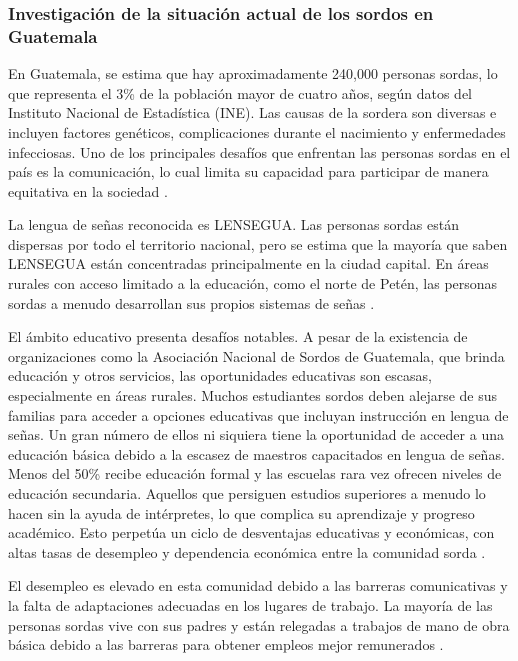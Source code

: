 
\subsubsection{Investigación de la situación actual de los sordos en Guatemala}

En Guatemala, se estima que hay aproximadamente 240,000 personas sordas, lo que representa el 3\% de la población mayor de cuatro años, según datos del Instituto Nacional de Estadística (INE). Las causas de la sordera son diversas e incluyen factores genéticos, complicaciones durante el nacimiento y enfermedades infecciosas. Uno de los principales desafíos que enfrentan las personas sordas en el país es la comunicación, lo cual limita su capacidad para participar de manera equitativa en la sociedad \cite{CongresoGuatemala} \cite{GobiernoGuatemala2022}.

La lengua de señas reconocida es LENSEGUA. Las personas sordas están dispersas por todo el territorio nacional, pero se estima que la mayoría que saben LENSEGUA están concentradas principalmente en la ciudad capital. En áreas rurales con acceso limitado a la educación, como el norte de Petén, las personas sordas a menudo desarrollan sus propios sistemas de señas \cite{JoshuaProject}. 

El ámbito educativo presenta desafíos notables. A pesar de la existencia de organizaciones como la Asociación Nacional de Sordos de Guatemala, que brinda educación y otros servicios, las oportunidades educativas son escasas, especialmente en áreas rurales. Muchos estudiantes sordos deben alejarse de sus familias para acceder a opciones educativas que incluyan instrucción en lengua de señas. Un gran número de ellos ni siquiera tiene la oportunidad de acceder a una educación básica debido a la escasez de maestros capacitados en lengua de señas. Menos del 50\% recibe educación formal y las escuelas rara vez ofrecen niveles de educación secundaria. Aquellos que persiguen estudios superiores a menudo lo hacen sin la ayuda de intérpretes, lo que complica su aprendizaje y progreso académico. Esto perpetúa un ciclo de desventajas educativas y económicas, con altas tasas de desempleo y dependencia económica entre la comunidad sorda \cite{EndangeredLanguages}.

El desempleo es elevado en esta comunidad debido a las barreras comunicativas y la falta de adaptaciones adecuadas en los lugares de trabajo. La mayoría de las personas sordas vive con sus padres y están relegadas a trabajos de mano de obra básica debido a las barreras para obtener empleos mejor remunerados \cite{EndangeredLanguages}.


